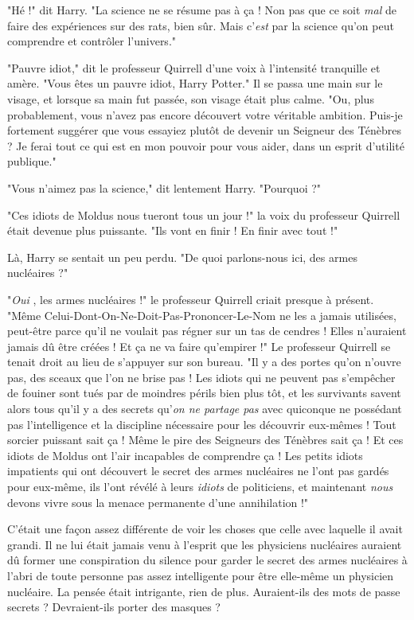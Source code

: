 "Hé !" dit Harry. "La science ne se résume pas à ça ! Non pas que ce soit \emph{mal}  de faire des expériences sur des rats, bien sûr. Mais c'\emph{est}  par la science qu'on peut comprendre et contrôler l'univers."

"Pauvre idiot," dit le professeur Quirrell d'une voix à l'intensité tranquille et amère. "Vous êtes un pauvre idiot, Harry Potter." Il se passa une main sur le visage, et lorsque sa main fut passée, son visage était plus calme. "Ou, plus probablement, vous n'avez pas encore découvert votre véritable ambition. Puis-je fortement suggérer que vous essayiez plutôt de devenir un Seigneur des Ténèbres ? Je ferai tout ce qui est en mon pouvoir pour vous aider, dans un esprit d'utilité publique."

"Vous n'aimez pas la science," dit lentement Harry. "Pourquoi ?"

"Ces idiots de Moldus nous tueront tous un jour !" la voix du professeur Quirrell était devenue plus puissante. "Ils vont en finir ! En finir avec tout !"

Là, Harry se sentait un peu perdu. "De quoi parlons-nous ici, des armes nucléaires ?"

"\emph{Oui} , les armes nucléaires !" le professeur Quirrell criait presque à présent. "Même Celui-Dont-On-Ne-Doit-Pas-Prononcer-Le-Nom ne les a jamais utilisées, peut-être parce qu'il ne voulait pas régner sur un tas de cendres ! Elles n'auraient jamais dû être créées ! Et ça ne va faire qu'empirer !" Le professeur Quirrell se tenait droit au lieu de s'appuyer sur son bureau. "Il y a des portes qu'on n'ouvre pas, des sceaux que l'on ne brise pas ! Les idiots qui ne peuvent pas s'empêcher de fouiner sont tués par de moindres périls bien plus tôt, et les survivants savent alors tous qu'il y a des secrets qu'\emph{on ne partage pas}  avec quiconque ne possédant pas l'intelligence et la discipline nécessaire pour les découvrir eux-mêmes ! Tout sorcier puissant sait ça ! Même le pire des Seigneurs des Ténèbres sait ça ! Et ces idiots de Moldus ont l'air incapables de comprendre ça ! Les petits idiots impatients qui ont découvert le secret des armes nucléaires ne l'ont pas gardés pour eux-même, ils l'ont révélé à leurs \emph{idiots}  de politiciens, et maintenant \emph{nous}  devons vivre sous la menace permanente d'une annihilation !"

C'était une façon assez différente de voir les choses que celle avec laquelle il avait grandi. Il ne lui était jamais venu à l'esprit que les physiciens nucléaires auraient dû former une conspiration du silence pour garder le secret des armes nucléaires à l'abri de toute personne pas assez intelligente pour être elle-même un physicien nucléaire. La pensée était intrigante, rien de plus. Auraient-ils des mots de passe secrets ? Devraient-ils porter des masques ?

